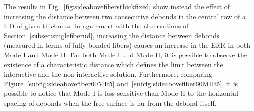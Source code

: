 \documentclass[review]{elsarticle}
\begin{document}
The results in Fig.~\ref{fig:sideabovefibersthickfixed} show instead the effect of increasing the distance between two consecutive debonds in the central row of a UD of given thickness. In agreement with the observations of Section~\ref{subsec:singlefiberud}, increasing the distance between debonds (measured in terms of fully bonded fibers) causes an increase in the ERR in both Mode I and Mode II. For both Mode I and Mode II, it is possible to observe the existence of a characteristic distance which defines the limit between the interactive and the non-interactive solution. Furthermore, comparing Figure~\ref{subfig:sideabovefiber60MIt5} and~\ref{subfig:sideabovefiber60MIIt5}, it is possible to notice that Mode I is less sensitive than Mode II to the horizontal spacing of debonds when the free surface is far from the debond itself.

\end{document}
